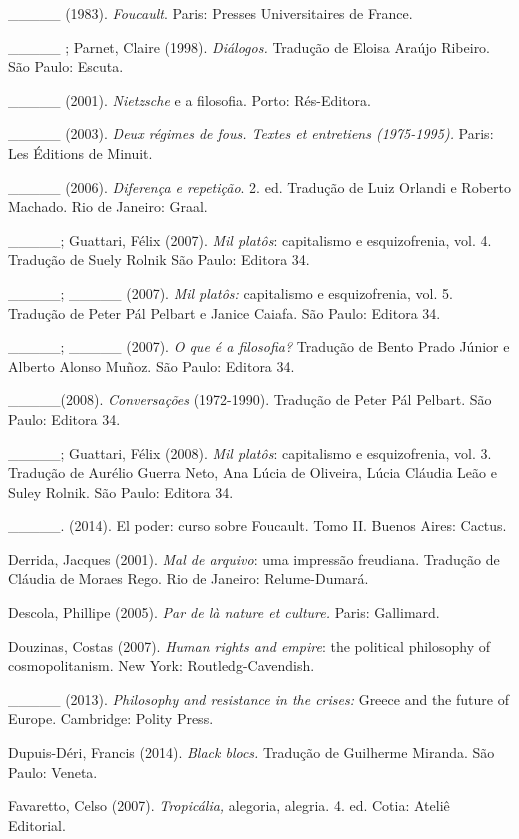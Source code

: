 \_\_\_\_\_ (1983). \emph{Foucault}. Paris: Presses Universitaires de
France.

\_\_\_\_\_ ; Parnet, Claire (1998). \emph{Diálogos.} Tradução de Eloisa
Araújo Ribeiro. São Paulo: Escuta.

\_\_\_\_\_ (2001). \emph{Nietzsche} e a filosofia. Porto: Rés-Editora.

\_\_\_\_\_ (2003). \emph{Deux régimes de fous. Textes et entretiens
(1975-1995). }Paris: Les Éditions de Minuit.

\_\_\_\_\_ (2006). \emph{Diferença e repetição}. 2. ed. Tradução de Luiz
Orlandi e Roberto Machado. Rio de Janeiro: Graal.

\_\_\_\_\_; Guattari, Félix (2007). \emph{Mil platôs}: capitalismo e
esquizofrenia, vol. 4. Tradução de Suely Rolnik São Paulo: Editora 34.

\_\_\_\_\_; \_\_\_\_\_ (2007). \emph{Mil platôs: }capitalismo e
esquizofrenia, vol. 5. Tradução de Peter Pál Pelbart e Janice Caiafa.
São Paulo: Editora 34.

\_\_\_\_\_; \_\_\_\_\_ (2007). \emph{O que é a filosofia? }Tradução de
Bento Prado Júnior e Alberto Alonso Muñoz. São Paulo: Editora 34.

\_\_\_\_\_(2008). \emph{Conversações} (1972-1990). Tradução de Peter Pál
Pelbart. São Paulo: Editora 34.

\_\_\_\_\_; Guattari, Félix (2008). \emph{Mil platôs}: capitalismo e
esquizofrenia, vol. 3. Tradução de Aurélio Guerra Neto, Ana Lúcia de
Oliveira, Lúcia Cláudia Leão e Suley Rolnik. São Paulo: Editora 34.

\_\_\_\_\_. (2014). El poder: curso sobre Foucault. Tomo II. Buenos
Aires: Cactus.

Derrida, Jacques (2001). \emph{Mal de arquivo}: uma impressão freudiana.
Tradução de Cláudia de Moraes Rego. Rio de Janeiro: Relume-Dumará.

Descola, Phillipe (2005). \emph{Par de là nature et culture. }Paris:
Gallimard.

Douzinas, Costas (2007). \emph{Human rights and empire}: the political
philosophy of cosmopolitanism. New York: Routledg-Cavendish.

\_\_\_\_\_ (2013). \emph{Philosophy and resistance in the crises:
}Greece and the future of Europe. Cambridge: Polity Press.

Dupuis-Déri, Francis (2014). \emph{Black blocs. }Tradução de Guilherme
Miranda. São Paulo: Veneta.

Favaretto, Celso (2007). \emph{Tropicália, }alegoria, alegria. 4. ed.
Cotia: Ateliê Editorial.

